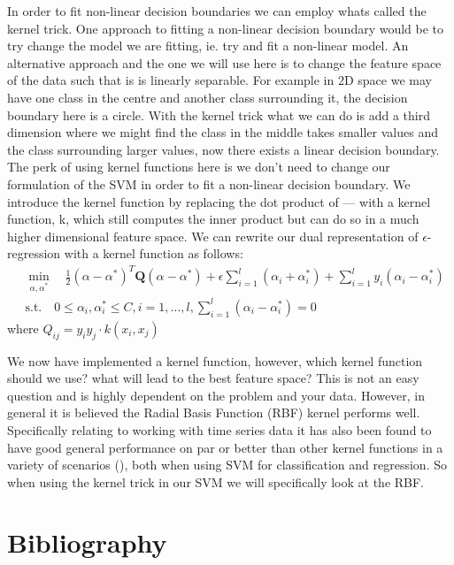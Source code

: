 \documentclass[11pt]{article}
\theoremstyle{definition}
\begin{document}
In order to fit non-linear decision boundaries we can employ whats called the kernel trick. One approach to fitting a non-linear decision boundary would be to try change the model we are fitting, ie. try and fit a non-linear model. An alternative approach and the one we will use here is to change the feature space of the data such that is is linearly separable. For example in 2D space we may have one class in the centre and another class surrounding it, the decision boundary here is a circle. With the kernel trick what we can do is add a third dimension where we might find the class in the middle takes smaller values and the class surrounding larger values, now there exists a linear decision boundary. The perk of using kernel functions here is we don't need to change our formulation of the SVM in order to fit a non-linear decision boundary. We introduce the kernel function by replacing the dot product of --- with a kernel function, k, which still computes the inner product but can do so in a much higher dimensional feature space. We can rewrite our dual representation of $\epsilon$-regression with a kernel function as follows:
\begin{align}
    &{} \min_{\alpha, \alpha^{*}} \quad \frac{1}{2} (\alpha - \alpha^{*})^{T} \mathbf{Q} (\alpha - \alpha^{*}) + \epsilon \sum_{i=1}^{l} (\alpha_{i} + \alpha_{i}^{*}) + \sum_{i=1}^{l} y_{i} (\alpha_{i} - \alpha_{i}^{*}) \\
    & \text{s.t.} \quad 0 \leq \alpha_{i}, \alpha_{i}^{*} \leq C, i=1,...,l, \sum_{i=1}^{l} (\alpha_{i} - \alpha_{i}^{*}) = 0
\end{align}
where $Q_{ij} = y_{i}  y_{j}  \cdot k(x_{i}, x_{j})$

We now have implemented a kernel function, however, which kernel function should we use? what will lead to the best feature space? This is not an easy question and is highly dependent on the problem and your data. However, in general it is believed the Radial Basis Function (RBF) kernel performs well. Specifically relating to working with time series data it has also been found to have good general performance on par or better than other kernel functions in a variety of scenarios (\cite{ruping2001svm}), both when using SVM for classification and regression. So when using the kernel trick in our SVM we will specifically look at the RBF.





\newpage


\newpage


\section{Bibliography}
\printbibliography
\end{document}
